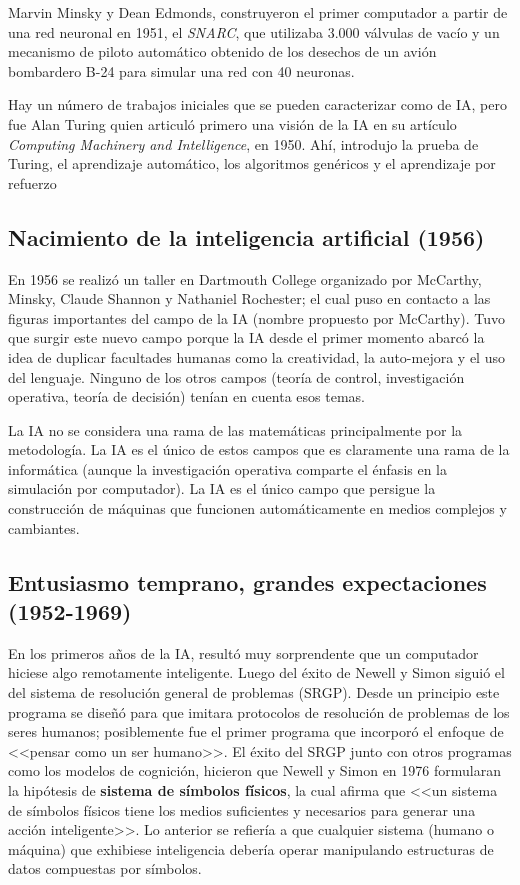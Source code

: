 \documentclass{article}
\begin{document}
 Marvin Minsky y Dean Edmonds, construyeron el primer computador a partir de una red neuronal en 1951, el \textit{SNARC}, que utilizaba 3.000 válvulas de vacío y un mecanismo de piloto automático obtenido de los desechos de un avión bombardero B-24 para simular una red con 40 neuronas.
 
 Hay un número de trabajos iniciales que se pueden caracterizar como de IA, pero fue Alan Turing quien articuló primero una visión de la IA en su artículo \textit{Computing Machinery and Intelligence}, en 1950. Ahí, introdujo la prueba de Turing, el aprendizaje automático, los algoritmos genéricos y el aprendizaje por refuerzo

\subsection{Nacimiento de la inteligencia artificial (1956)}

En 1956 se realizó un taller en Dartmouth College organizado por McCarthy, Minsky, Claude Shannon y Nathaniel Rochester; el cual puso en contacto a las figuras importantes del campo de la IA (nombre propuesto por McCarthy). Tuvo que surgir este nuevo campo porque la IA desde el primer momento abarcó la idea de duplicar facultades humanas como la creatividad, la auto-mejora y el uso del lenguaje. Ninguno de los otros campos (teoría de control, investigación operativa, teoría de decisión) tenían en cuenta esos temas.

La IA no se considera una rama de las matemáticas principalmente por la metodología. La IA es el único de estos campos que es claramente una rama de la informática (aunque la investigación operativa comparte el énfasis en la simulación por computador). La IA es el único campo que persigue la construcción de máquinas que funcionen automáticamente en medios complejos y cambiantes.

\subsection{Entusiasmo temprano, grandes expectaciones (1952-1969)}

En los primeros años de la IA, resultó muy sorprendente que un computador hiciese algo remotamente inteligente. Luego del éxito de Newell y Simon siguió el del sistema de resolución general de problemas (SRGP). Desde un principio este programa se diseñó para que imitara protocolos de resolución de problemas de los seres humanos; posiblemente fue el primer programa que incorporó el enfoque de <<pensar como un ser humano>>. El éxito del SRGP junto con otros programas como los modelos de cognición, hicieron que Newell y Simon en 1976 formularan la hipótesis de \textbf{sistema de símbolos físicos}, la cual afirma que <<un sistema de símbolos físicos tiene los medios suficientes y necesarios para generar una acción inteligente>>. Lo anterior se refiería a que cualquier sistema (humano o máquina) que exhibiese inteligencia debería operar manipulando estructuras de datos compuestas por símbolos.
\end{document}
